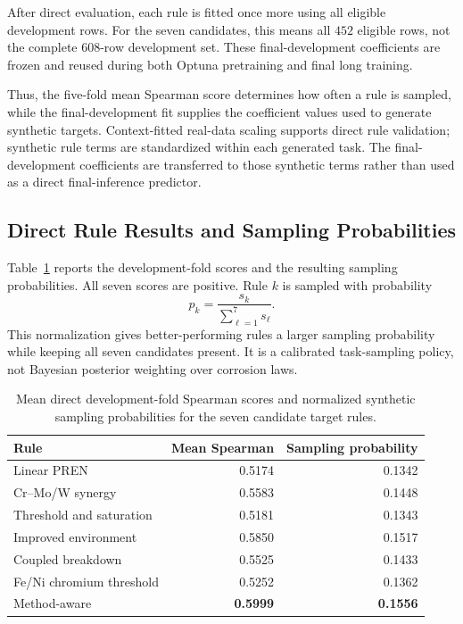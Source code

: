 \documentclass{article}
\begin{document}
After direct evaluation, each rule is fitted once more using all eligible
development rows. For the seven candidates, this means all \(452\) eligible
rows, not the complete \(608\)-row development set. These final-development
coefficients are frozen and reused during both Optuna pretraining and final
long training.

Thus, the five-fold mean Spearman score determines how often a rule is sampled,
while the final-development fit supplies the coefficient values used to
generate synthetic targets. Context-fitted real-data scaling supports direct
rule validation; synthetic rule terms are standardized within each generated
task. The final-development coefficients are transferred to those synthetic
terms rather than used as a direct final-inference predictor.

\subsection{Direct Rule Results and Sampling Probabilities}
\label{sec:rule-probabilities}

Table~\ref{tab:rule-probabilities} reports the development-fold scores and the
resulting sampling probabilities. All seven scores are positive. Rule \(k\)
is sampled with probability
\begin{equation}
p_k=\frac{s_k}{\sum_{\ell=1}^{7}s_\ell}.
\label{eq:rule-probabilities}
\end{equation}
This normalization gives better-performing rules a larger sampling
probability while keeping all seven candidates present. It is a calibrated
task-sampling policy, not Bayesian posterior weighting over corrosion laws.

\begin{table}[htbp]
\centering
\caption{Mean direct development-fold Spearman scores and normalized
synthetic sampling probabilities for the seven candidate target rules.}
\label{tab:rule-probabilities}
\begin{tabular}{lrr}
\toprule
Rule & Mean Spearman & Sampling probability \\
\midrule
Linear PREN & 0.5174 & 0.1342 \\
Cr--Mo/W synergy & 0.5583 & 0.1448 \\
Threshold and saturation & 0.5181 & 0.1343 \\
Improved environment & 0.5850 & 0.1517 \\
Coupled breakdown & 0.5525 & 0.1433 \\
Fe/Ni chromium threshold & 0.5252 & 0.1362 \\
Method-aware & \textbf{0.5999} & \textbf{0.1556} \\
\bottomrule
\end{tabular}
\end{table}
\end{document}
